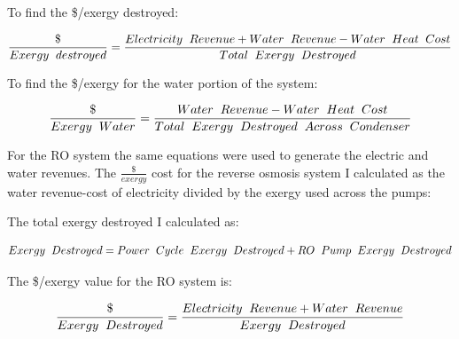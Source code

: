\documentclass[12pt]{UIdahoMastersThesis}
\begin{document}
To find the \$/exergy destroyed:

\begin{equation*}
\frac{\$}{Exergy\hspace{.2cm}destroyed}=\frac{Electricity \hspace{.2cm} Revenue+ Water \hspace{.2cm} Revenue - Water \hspace{.2cm} Heat\hspace{.2cm}Cost}{Total\hspace{.2cm}Exergy\hspace{.2cm}Destroyed}
\end{equation*}

To find the \$/exergy for the water portion of the system:

\begin{equation*}
\frac{\$}{Exergy\hspace{.2cm}Water}=\frac{Water \hspace{.2cm} Revenue - Water \hspace{.2cm} Heat\hspace{.2cm}Cost}{Total\hspace{.2cm}Exergy\hspace{.2cm}Destroyed\hspace{.2cm}Across\hspace{.2cm}Condenser}
\end{equation*}

For the RO system the same equations were used to generate the electric and water revenues. The $\frac{\$}{exergy}$ cost for the reverse osmosis system I calculated as the water revenue-cost of electricity divided by the exergy used across the pumps:

The total exergy destroyed I calculated as:

\begin{equation*}
Exergy\hspace{.2cm}Destroyed = Power\hspace{.2cm}Cycle\hspace{.2cm}Exergy\hspace{.2cm}Destroyed+RO\hspace{.2cm}Pump\hspace{.2cm}Exergy\hspace{.2cm}Destroyed
\end{equation*}

The \$/exergy value for the RO system is:

\begin{equation*}
\frac{\$}{Exergy\hspace{.2cm}Destroyed}=\frac{Electricity \hspace{.2cm} Revenue+ Water \hspace{.2cm} Revenue}{Exergy\hspace{.2cm}Destroyed}
\end{equation*}
\end{document}
